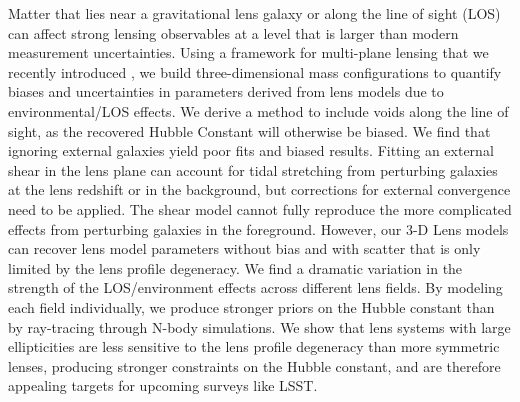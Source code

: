 Matter that lies near a gravitational lens galaxy or along the line of sight (LOS) can affect strong lensing observables at a level that is larger than modern measurement uncertainties. Using a framework for multi-plane lensing that we recently introduced \citep{McCully14}, we build three-dimensional mass configurations to quantify biases and uncertainties in parameters derived from lens models due to environmental/LOS effects. We derive a method to include voids along the line of sight, as the recovered Hubble Constant will otherwise be biased. We find that ignoring external galaxies yield poor fits and biased results. Fitting an external shear in the lens plane can account for tidal stretching from perturbing galaxies at the lens redshift or in the background, but corrections for external convergence need to be applied. The shear model cannot fully reproduce the more complicated effects from perturbing galaxies in the foreground. However, our 3-D Lens models can recover lens model parameters without bias and with scatter that is only limited by the lens profile degeneracy. We find a dramatic variation in the strength of the LOS/environment effects across different lens fields. By modeling each field individually, we produce stronger priors on the Hubble constant than by ray-tracing through N-body simulations.  We show that lens systems with large ellipticities are less sensitive to the lens profile degeneracy than more symmetric lenses, producing stronger constraints on the Hubble constant, and are therefore appealing targets for upcoming surveys like LSST.
  
  
  
